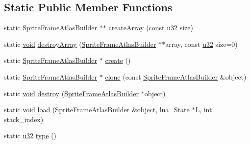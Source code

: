 \subsection*{Static Public Member Functions}
\begin{DoxyCompactItemize}
\item 
static \mbox{\hyperlink{classnjli_1_1_sprite_frame_atlas_builder}{Sprite\+Frame\+Atlas\+Builder}} $\ast$$\ast$ \mbox{\hyperlink{classnjli_1_1_sprite_frame_atlas_builder_a406c0a0878ee1a16d22bed1ff0d72a2d}{create\+Array}} (const \mbox{\hyperlink{_util_8h_a10e94b422ef0c20dcdec20d31a1f5049}{u32}} size)
\item 
static \mbox{\hyperlink{_thread_8h_af1e856da2e658414cb2456cb6f7ebc66}{void}} \mbox{\hyperlink{classnjli_1_1_sprite_frame_atlas_builder_a5c55b6ead0735374e555a30a1c52d3bb}{destroy\+Array}} (\mbox{\hyperlink{classnjli_1_1_sprite_frame_atlas_builder}{Sprite\+Frame\+Atlas\+Builder}} $\ast$$\ast$array, const \mbox{\hyperlink{_util_8h_a10e94b422ef0c20dcdec20d31a1f5049}{u32}} size=0)
\item 
static \mbox{\hyperlink{classnjli_1_1_sprite_frame_atlas_builder}{Sprite\+Frame\+Atlas\+Builder}} $\ast$ \mbox{\hyperlink{classnjli_1_1_sprite_frame_atlas_builder_ad4e9ac86b040e0e7213f548325a1d420}{create}} ()
\item 
static \mbox{\hyperlink{classnjli_1_1_sprite_frame_atlas_builder}{Sprite\+Frame\+Atlas\+Builder}} $\ast$ \mbox{\hyperlink{classnjli_1_1_sprite_frame_atlas_builder_ab67505f778002fc04c16abc632a67647}{clone}} (const \mbox{\hyperlink{classnjli_1_1_sprite_frame_atlas_builder}{Sprite\+Frame\+Atlas\+Builder}} \&object)
\item 
static \mbox{\hyperlink{_thread_8h_af1e856da2e658414cb2456cb6f7ebc66}{void}} \mbox{\hyperlink{classnjli_1_1_sprite_frame_atlas_builder_a844af7ae09c217f0af71bbf998d8af10}{destroy}} (\mbox{\hyperlink{classnjli_1_1_sprite_frame_atlas_builder}{Sprite\+Frame\+Atlas\+Builder}} $\ast$object)
\item 
static \mbox{\hyperlink{_thread_8h_af1e856da2e658414cb2456cb6f7ebc66}{void}} \mbox{\hyperlink{classnjli_1_1_sprite_frame_atlas_builder_a1a712251b63be506616c6d23eaf8d0df}{load}} (\mbox{\hyperlink{classnjli_1_1_sprite_frame_atlas_builder}{Sprite\+Frame\+Atlas\+Builder}} \&object, lua\+\_\+\+State $\ast$L, int stack\+\_\+index)
\item 
static \mbox{\hyperlink{_util_8h_a10e94b422ef0c20dcdec20d31a1f5049}{u32}} \mbox{\hyperlink{classnjli_1_1_sprite_frame_atlas_builder_afa4a71dfece90df012bf601ab30e4548}{type}} ()
\end{DoxyCompactItemize}
